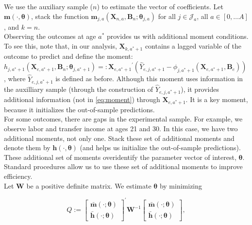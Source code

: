 \noindent We use the auxiliary sample ($n$) to estimate the vector of coefficients. Let $\bm{m} \left ( \cdot, \bm{\theta} \right)$, stack the function $\bm{m}_{j,a} \left( \bm{X}_{n,a}, \bm{B}_{n} ; \bm{\theta}_{j,a} \right)$  for all $j \in \mathcal{J}_a$, all $a \in [0, \ldots A]$, and $k = n$.\\

\noindent Observing the outcomes at age $a^*$ provides us with additional moment conditions. To see this, note that, in our analysis,  $\bm{X}_{k,a^*+1}$ contains a lagged variable of the outcome to predict and define the moment: $h_{j,a^*+1}  \left( \bm{X}_{e,a^*+1}, \bm{B}_{n} ; \bm{\theta}_{j,a^*+1} \right) =:  {\bm{X}_{e,a^*+1}}^{'} \left( \hat{Y}_{e,j,a^*+1} - \phi_{j,a^*+1} \left ( \bm{X}_{e,a^*+1}, \bm{B}_{e} \right) \right)$, where $\hat{Y}_{e,j,a^*+1}$ is defined as before. Although this moment uses information in the auxilliary sample (through the construction of $\hat{Y}_{e,j,a^*+1}$), it provides additional information (not in \eqref{eq:moment}) through $\bm{X}_{e,a^*+1}$. It is a key moment, because it initializes the out-of-sample predictions.\\

\noindent For some outcomes, there are gaps in the experimental sample. For example, we observe labor and transfer income at ages 21 and 30. In this case, we have two additional moments, not only one. Stack these set of additional moments and denote them by $\bm{h} \left ( \cdot, \bm{\theta} \right)$ (and helps us initialize the out-of-sample predictions). These additional set of moments overidentify the parameter vector of interest, $\bm{\theta}$. Standard procedures allow us to use these set of additional moments to improve efficiency.\\

\noindent Let $\bm{W}$ be a positive definite matrix. We estimate $\bm{\theta}$ by minimizing

\begin{equation}
Q :=  {\begin{bmatrix} {\bm{\bar{m}} \left( \cdot ; \bm{\theta} \right) }  \\ {\bm{\bar{h}} \left( \cdot ; \bm{\theta} \right) }  \end{bmatrix}}^{'}
\bm{W} ^{-1}{\begin{bmatrix} {\bm{\bar{m}} \left( \cdot ; \bm{\theta} \right) }  \\ {\bm{\bar{h}} \left( \cdot ; \bm{\theta} \right) }  \end{bmatrix}}, \label{eq:wloss}
\end{equation}\\

